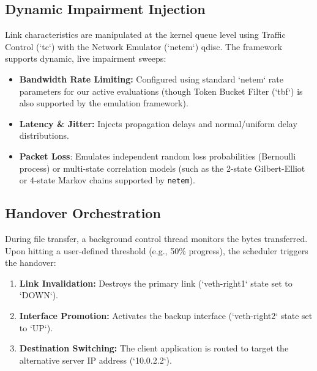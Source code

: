 \documentclass[conference]{IEEEtran}
\begin{document}
\subsection{Dynamic Impairment Injection}
Link characteristics are manipulated at the kernel queue level using Traffic Control (`tc`) with the Network Emulator (`netem`) qdisc. The framework supports dynamic, live impairment sweeps:
\begin{itemize}
    \item \textbf{Bandwidth Rate Limiting:} Configured using standard `netem` rate parameters for our active evaluations (though Token Bucket Filter (`tbf`) is also supported by the emulation framework).
    \item \textbf{Latency \& Jitter:} Injects propagation delays and normal/uniform delay distributions.
    \item \textbf{Packet Loss}: Emulates independent random loss probabilities (Bernoulli process) or multi-state correlation models (such as the 2-state Gilbert-Elliot or 4-state Markov chains supported by \texttt{netem}).
\end{itemize}

\subsection{Handover Orchestration}
During file transfer, a background control thread monitors the bytes transferred. Upon hitting a user-defined threshold (e.g., 50\% progress), the scheduler triggers the handover:
\begin{enumerate}
    \item \textbf{Link Invalidation:} Destroys the primary link (`veth-right1` state set to `DOWN`).
    \item \textbf{Interface Promotion:} Activates the backup interface (`veth-right2` state set to `UP`).
    \item \textbf{Destination Switching:} The client application is routed to target the alternative server IP address (`10.0.2.2`).
\end{enumerate}
\end{document}
